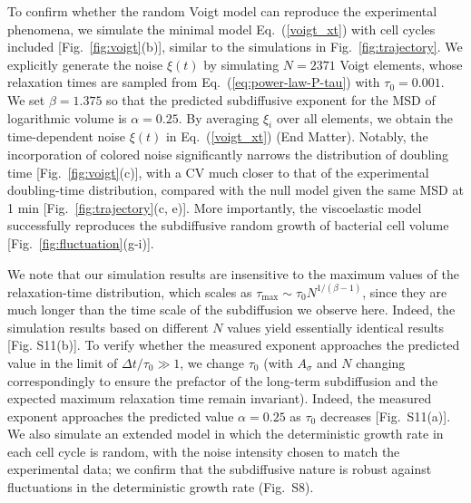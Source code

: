 \documentclass[aps, prl, twocolumn, longbibliography, linenumbers, superscriptaddress]{revtex4-2}
\newcommand{\blue}{\color{blue}}
\begin{document}
To confirm whether the random Voigt model can reproduce the experimental phenomena, we simulate the minimal model Eq.~(\ref{voigt_xt}) with cell cycles included [Fig.~\ref{fig:voigt}(b)], similar to the simulations in Fig.~\ref{fig:trajectory}. We explicitly generate the noise $\xi(t)$ by simulating $N=2371$ Voigt elements, whose relaxation times are sampled from Eq.~(\ref{eq:power-law-P-tau}) with $\tau_0=0.001$. We set $\beta=1.375$ so that the predicted subdiffusive exponent for the MSD of logarithmic volume is $\alpha=0.25$. By averaging $\xi_i$ over all elements, we obtain the time-dependent noise $\xi(t)$ in Eq.~(\ref{voigt_xt}) (End Matter). {\blue Notably, the incorporation of colored noise significantly narrows the distribution of doubling time [Fig.~\ref{fig:voigt}(c)], with a CV much closer to that of the experimental doubling-time distribution, compared with the null model given the same MSD at 1 min [Fig.~\ref{fig:trajectory}(c, e)]. More importantly, the viscoelastic model successfully reproduces the subdiffusive random growth of bacterial cell volume [Fig.~\ref{fig:fluctuation}(g-i)].}


{\blue We note that our simulation results are insensitive to the maximum values of the relaxation-time distribution, which scales as $\tau_{\max}\sim \tau_0 N^{1/(\beta-1)}$, since they are much longer than the time scale of the subdiffusion we observe here. Indeed, the simulation results based on different $N$ values yield essentially identical results [Fig. S11(b)].} To verify whether the measured exponent approaches the predicted value in the limit of $\Delta t/\tau_0\gg 1$, we change $\tau_0$ (with $A_{\sigma}$ and $N$ changing correspondingly to ensure the prefactor of the long-term subdiffusion and the expected maximum relaxation time remain invariant). Indeed, the measured exponent approaches the predicted value $\alpha=0.25$ as $\tau_0$ decreases [Fig.~S11(a)]. We also simulate an extended model in which the deterministic growth rate in each cell cycle is random, with the noise intensity chosen to match the experimental data; we confirm that the subdiffusive nature is robust against fluctuations in the deterministic growth rate (Fig.~S8).
\end{document}
